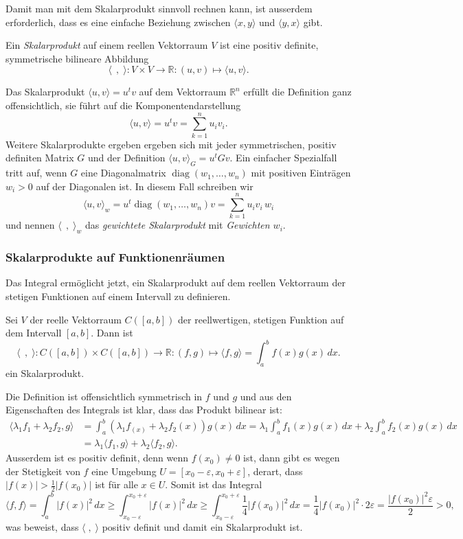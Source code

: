 Damit man mit dem Skalarprodukt sinnvoll rechnen kann, ist ausserdem
erforderlich, dass es eine einfache Beziehung zwischen 
$\langle x,y\rangle$ und $\langle y,x\rangle$ gibt.

\begin{definition}
Ein {\em Skalarprodukt} auf einem reellen Vektorraum $V$ ist eine
positiv definite, symmetrische bilineare Abbildung
\[
\langle\;\,,\;\rangle
\colon
V\times V
\to
\mathbb{R}
:
(u,v) \mapsto \langle u,v\rangle.
\]
\end{definition}

Das Skalarprodukt $\langle u,v\rangle=u^tv$ auf dem Vektorraum 
$\mathbb{R}^n$ erfüllt die Definition ganz offensichtlich,
sie führt auf die Komponentendarstellung
\[
\langle u,v\rangle = u^tv = \sum_{k=1}^n u_iv_i.
\]
Weitere Skalarprodukte ergeben ergeben sich mit jeder symmetrischen,
positiv definiten Matrix $G$ und der Definition
$\langle u,v\rangle_G=u^tGv$.
Ein einfacher Spezialfall tritt auf, wenn $G$ eine Diagonalmatrix
$\operatorname{diag}(w_1,\dots,w_n)$
mit positiven Einträgen $w_i>0$ auf der Diagonalen ist.
In diesem Fall schreiben wir
\[
\langle u,v\rangle_w
=
u^t\operatorname{diag}(w_1,\dots,w_n)v
=
\sum_{k=1}^n u_iv_i\,w_i
\]
und nennen $\langle \;\,,\;\rangle_w$ das {\em gewichtete Skalarprodukt}
mit {\em Gewichten $w_i$}.

\subsubsection{Skalarprodukte auf Funktionenräumen}
Das Integral ermöglicht jetzt, ein Skalarprodukt auf dem reellen
Vektorraum der stetigen Funktionen auf einem Intervall zu definieren.

\begin{definition}
\label{buch:orthogonal:def:skalarprodukt}
Sei $V$ der reelle Vektorraum $C([a,b])$ der reellwertigen, stetigen
Funktion auf dem Intervall $[a,b]$.
Dann ist 
\[
\langle\;\,,\;\rangle
\colon
C([a,b]) \times C([a,b]) \to \mathbb{R}
:
(f,g) \mapsto \langle f,g\rangle = \int_a^b f(x)g(x)\,dx.
\]
ein Skalarprodukt.
\end{definition}

Die Definition ist offensichtlich symmetrisch in $f$ und $g$ und
aus den Eigenschaften des Integrals ist klar, dass das Produkt
bilinear ist:
\begin{align*}
\langle \lambda_1 f_1+\lambda_2f_2,g\rangle
&=
\int_a^b (\lambda_1f_(x) +\lambda_2f_2(x))g(x)\,dx
=
\lambda_1\int_a^b f_1(x) g(x)\,dx
+
\lambda_2\int_a^b f_2(x) g(x)\,dx
\\
&=
\lambda_1\langle f_1,g\rangle
+
\lambda_2\langle f_2,g\rangle.
\end{align*}
Ausserdem ist es positiv definit, denn wenn $f(x_0) \ne 0$ ist,
dann gibt es wegen der Stetigkeit von $f$ eine Umgebung
$U=[x_0-\varepsilon,x_0+\varepsilon]$, derart, dass $|f(x)| > \frac12|f(x_0)|$
ist für alle $x\in U$.
Somit ist das Integral
\[
\langle f,f\rangle
=
\int_a^b |f(x)|^2\,dx
\ge
\int_{x_0-\varepsilon}^{x_0+\varepsilon} |f(x)|^2\,dx
\ge
\int_{x_0-\varepsilon}^{x_0+\varepsilon} \frac14|f(x_0)|^2\,dx
=
\frac{1}{4}|f(x_0)|^2\cdot 2\varepsilon
=
\frac{|f(x_0)|^2\varepsilon}{2}
>0,
\]
was beweist, dass $\langle\;,\;\rangle$ positiv definit und damit
ein Skalarprodukt ist.

